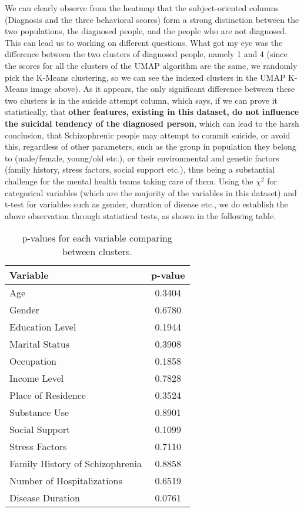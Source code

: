 \documentclass{article}
\begin{document}
We can clearly observe from the heatmap that the subject-oriented columns (Diagnosis and the three behavioral scores) form a strong distinction between the two populations, the diagnosed people, and the people who are not diagnosed. This can lead us to working on different questions. What got my eye was the difference between the two clusters of diagnosed people, namely 1 and 4 (since the scores for all the clusters of the UMAP algorithm are the same, we randomly pick the K-Means clustering, so we can see the indexed clusters in the UMAP K-Means image above).
As it appears, the only significant difference between these two clusters is in the suicide attempt column, which says, if we can prove it statistically, that \textbf{other features, existing in this dataset, do not influence the suicidal tendency of the diagnosed person}, which can lead to the harsh conclusion, that Schizophrenic people may attempt to commit suicide, or avoid this, regardless of other parameters, such as the group in population they belong to (male/female, young/old etc.), or their environmental and genetic factors (family history, stress factors, social support etc.), thus being a substantial challenge for the mental health teams taking care of them. 
Using the $\chi^2$ for categorical variables (which are the majority of the variables in this dataset) and t-test for variables such as gender, duration of disease etc., we do establish the above observation through statistical tests, as shown in the following table.
\begin{table}[h]
\centering
\begin{tabular}{|l|c|}
\hline
\textbf{Variable} & \textbf{p-value} \\
\hline
Age & 0.3404 \\
Gender & 0.6780 \\
Education Level & 0.1944 \\
Marital Status & 0.3908 \\
Occupation & 0.1858 \\
Income Level & 0.7828 \\
Place of Residence & 0.3524 \\
Substance Use & 0.8901 \\
Social Support & 0.1099 \\
Stress Factors & 0.7110 \\
Family History of Schizophrenia & 0.8858 \\
Number of Hospitalizations & 0.6519 \\
Disease Duration & 0.0761 \\
\hline
\end{tabular}
\caption{p-values for each variable comparing between clusters.}
\label{tab:p_values}
\end{table}
\end{document}

